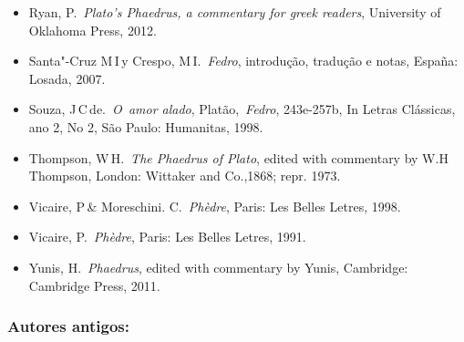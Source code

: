 \begin{itemize}
\item
  Ryan, P.~\emph{Plato's Phaedrus, a commentary for greek readers},
  University of Oklahoma Press, 2012.
\item
  Santa"-Cruz M\,I\,y Crespo, M\,I.~\emph{Fedro}, introdução, tradução e
  notas, España: Losada, 2007.
\item
  Souza, J\,C\,de.~\emph{O~amor alado}, Platão,~\emph{Fedro}, 243e-257b,
  In Letras Clássicas, ano 2, No 2, São Paulo: Humanitas, 1998.
\item
  Thompson, W\,H.~\emph{The Phaedrus of Plato}, edited with commentary
  by W.H\,Thompson, London: Wittaker and Co.,1868; repr. 1973.
\item
  Vicaire, P\,\& Moreschini. C.~\emph{Phèdre}, Paris: Les Belles Letres,
  1998.
\item
  Vicaire, P.~\emph{Phèdre}, Paris: Les Belles Letres, 1991.
\item
  Yunis, H.~\emph{Phaedrus}, edited with commentary by Yunis, Cambridge:
  Cambridge Press, 2011.
\end{itemize}

 

\subsubsection{Autores antigos:}

 

